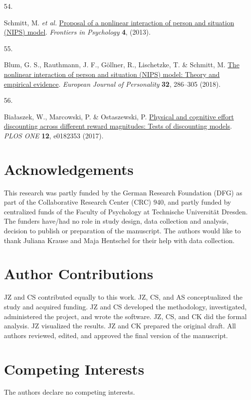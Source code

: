 \documentclass[
  man,floatsintext]{apa6}
\newlength{\cslhangindent}
\newlength{\csllabelwidth}
\newlength{\cslentryspacingunit} %
\newenvironment{CSLReferences}[2] %
 {%
  \setlength{\parindent}{0pt}
  \ifodd #1
  \let\oldpar\par
  \def\par{\hangindent=\cslhangindent\oldpar}
  \fi
  \setlength{\parskip}{#2\cslentryspacingunit}
 }%
 {}
\newcommand{\CSLLeftMargin}[1]{\parbox[t]{\csllabelwidth}{#1}}
\newcommand{\CSLRightInline}[1]{\parbox[t]{\linewidth - \csllabelwidth}{#1}\break}
\begin{document}
\begin{CSLReferences}{0}{0}
\leavevmode{}%
\CSLLeftMargin{54. }%
\CSLRightInline{Schmitt, M. \emph{et al.} \href{https://doi.org/10.3389/fpsyg.2013.00499}{Proposal of a nonlinear interaction of person and situation ({NIPS}) model}. \emph{Frontiers in Psychology} \textbf{4}, (2013).}

\leavevmode{}%
\CSLLeftMargin{55. }%
\CSLRightInline{Blum, G. S., Rauthmann, J. F., Göllner, R., Lischetzke, T. \& Schmitt, M. \href{https://doi.org/10.1002/per.2138}{The nonlinear interaction of person and situation ({NIPS)} model: {Theory} and empirical evidence}. \emph{European Journal of Personality} \textbf{32}, 286--305 (2018).}

\leavevmode{}%
\CSLLeftMargin{56. }%
\CSLRightInline{Białaszek, W., Marcowski, P. \& Ostaszewski, P. \href{https://doi.org/10.1371/journal.pone.0182353}{Physical and cognitive effort discounting across different reward magnitudes: Tests of discounting models}. \emph{{PLOS} {ONE}} \textbf{12}, e0182353 (2017).}

\end{CSLReferences}

\endgroup

\newpage

\hypertarget{acknowledgements}{%
\section{Acknowledgements}\label{acknowledgements}}

This research was partly funded by the German Research Foundation (DFG) as part of the Collaborative Research Center (CRC) 940, and partly funded by centralized funds of the Faculty of Psychology at Technische Universität Dresden.
The funders have/had no role in study design, data collection and analysis, decision to publish or preparation of the manuscript.
The authors would like to thank Juliana Krause and Maja Hentschel for their help with data collection.

\hypertarget{author-contributions}{%
\section{Author Contributions}\label{author-contributions}}

JZ and CS contributed equally to this work.
JZ, CS, and AS conceptualized the study and acquired funding.
JZ and CS developed the methodology, investigated, administered the project, and wrote the software.
JZ, CS, and CK did the formal analysis.
JZ visualized the results.
JZ and CK prepared the original draft.
All authors reviewed, edited, and approved the final version of the manuscript.

\hypertarget{competing-interests}{%
\section{Competing Interests}\label{competing-interests}}

The authors declare no competing interests.
\end{document}
